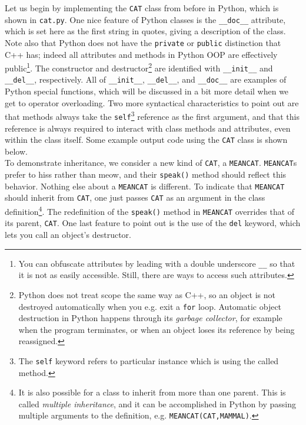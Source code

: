 Let us begin by implementing the \texttt{CAT} class from before in Python,
which is shown in \texttt{cat.py}. One nice feature of Python classes
is the \texttt{\_\_doc\_\_} attribute, which is set here as the first string
in quotes, giving a description of the class. Note also that Python
does not have the \texttt{private} or \texttt{public} distinction that
C++ has; indeed all attributes and methods in Python OOP are effectively 
public\footnote{You can obfuscate attributes by leading with a double 
underscore \texttt{\_\_} so that it is not as easily accessible. Still, there 
are ways to access such attributes.}.
The constructor and destructor\footnote{Python does not treat scope the same
way as C++, so an object is not destroyed automatically when you e.g.
exit a \texttt{for} loop. Automatic object destruction in Python 
happens through 
its {\it garbage collector}, for example when the program terminates,
or when an object loses its reference by being reassigned.} are identified with
\texttt{\_\_init\_\_} and \texttt{\_\_del\_\_}, respectively. All of
\texttt{\_\_init\_\_}, \texttt{\_\_del\_\_}, and \texttt{\_\_doc\_\_} 
are examples of
Python special functions, which will be discussed in a bit more detail
when we get to operator overloading. 
Two more syntactical characteristics 
to point out are that methods always take the \texttt{self}\footnote{The
\texttt{self} keyword refers to particular instance which is using
the called method.} reference as 
the first argument, and that this reference is always required to
interact with class methods and attributes, even within the class itself.
Some example output code using the \texttt{CAT} class is shown below.\\




To demonstrate inheritance, we consider a new kind of \texttt{CAT}, a
\texttt{MEANCAT}. \texttt{MEANCAT}s prefer to hiss rather than meow, and
their \texttt{speak()} method should reflect this behavior. Nothing else
about a \texttt{MEANCAT} is different. To indicate that \texttt{MEANCAT}
should inherit from \texttt{CAT}, one just passes \texttt{CAT} as an argument
in the class definition\footnote{It is also possible for a class to inherit
from more than one parent. This is called {\it multiple inheritance},
 and it can be accomplished in Python by passing
multiple arguments to the definition, e.g. \texttt{MEANCAT(CAT,MAMMAL)}.}. 
The redefinition of the \texttt{speak()} method
in \texttt{MEANCAT} overrides that of its parent, \texttt{CAT}. One last
feature to point out is the use of the \texttt{del} keyword, which lets you
call an object's destructor.\\

